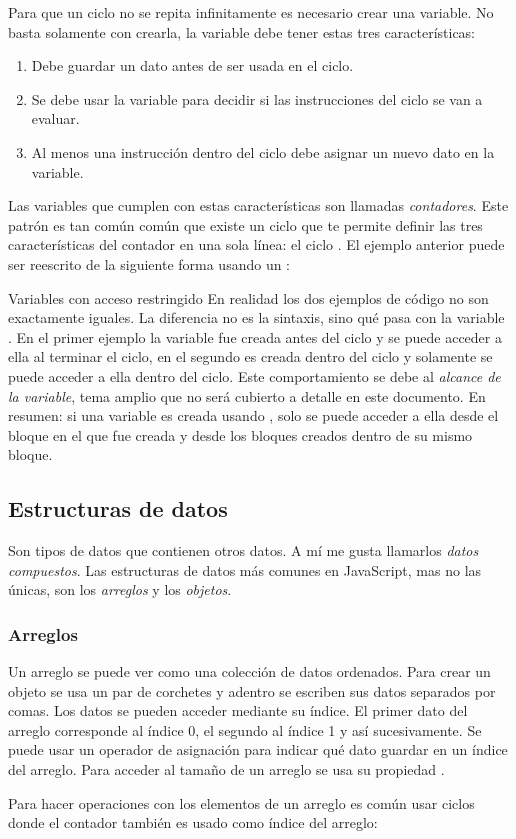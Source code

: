 \documentclass{article}
\newcommand{\code}[1]{\tcbox{\texttt{#1}}}
\newcommand{\codejs}[1]{\tcbox{\lstinline[style=ES6]{#1}}}
\begin{document}
Para que un ciclo no se repita infinitamente es necesario crear una variable. No basta solamente con crearla, la variable debe tener estas tres características:
\begin{enumerate}
  \item Debe guardar un dato antes de ser usada en el ciclo.
  \item Se debe usar la variable para decidir si las instrucciones del ciclo se van a evaluar.
  \item Al menos una instrucción dentro del ciclo debe asignar un nuevo dato en la variable.
\end{enumerate}
Las variables que cumplen con estas características son llamadas \textit{contadores}. Este patrón es tan común común que existe un ciclo que te permite definir las tres características del contador en una sola línea: el ciclo \codejs{for}. El ejemplo anterior puede ser reescrito de la siguiente forma usando un \codejs{for}:

\begin{bclogo}[logo=\bcinfo, couleurBarre=orange, noborder=true, couleur=white]{Variables con acceso restringido}
En realidad los dos ejemplos de código no son exactamente iguales. La diferencia no es la sintaxis, sino qué pasa con la variable \codejs{número}. En el primer ejemplo la variable fue creada antes del ciclo \codejs{while} y se puede acceder a ella al terminar el ciclo, en el segundo es creada dentro del ciclo \codejs{for} y solamente se puede acceder a ella dentro del ciclo. Este comportamiento se debe al \textit{alcance de la variable}\cite{scope}, tema amplio que no será cubierto a detalle en este documento. En resumen: si una variable es creada usando \codejs{let}, solo se puede acceder a ella desde el bloque en el que fue creada y desde los bloques creados dentro de su mismo bloque.
\end{bclogo}


\subsection{Estructuras de datos}
Son tipos de datos que contienen otros datos. A mí me gusta llamarlos \textit{datos compuestos}. Las estructuras de datos más comunes en JavaScript, mas no las únicas, son los \textit{arreglos} y los \textit{objetos}.
\subsubsection{Arreglos}
Un arreglo se puede ver como una colección de datos ordenados. Para crear un objeto se usa un par de corchetes \codejs{[ ]} y adentro se escriben sus datos separados por comas. Los datos se pueden acceder mediante su índice. El primer dato del arreglo corresponde al índice 0, el segundo al índice 1 y así sucesivamente. Se puede usar un operador de asignación para indicar qué dato guardar en un índice del arreglo. Para acceder al tamaño de un arreglo se usa su propiedad \code{length}.

Para hacer operaciones con los elementos de un arreglo es común usar ciclos donde el contador también es usado como índice del arreglo:

\end{document}
